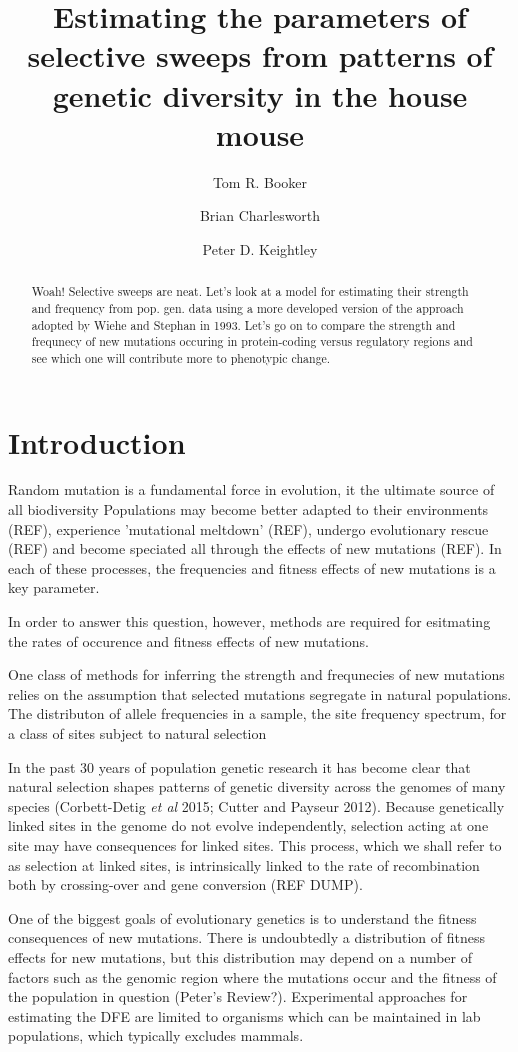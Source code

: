 \documentclass[11pt]{article}
\title{\textbf{Estimating the parameters of selective sweeps from patterns of genetic diversity in the house mouse}}
\author[1,*]{Tom R. Booker}
\author[1]{Brian Charlesworth}
\author[1]{Peter D. Keightley}
\affil[1]{Institute of Evolutionary Biology, University of Edinburgh, Edinburgh}
\affil[*]{\emph{t.r.booker@sms.ed.ac.uk}}
\begin{document}
\maketitle
\begin{abstract}
Woah! Selective sweeps are neat. Let's look at a model for estimating their strength and frequency from pop. gen. data using a more developed version of the approach adopted by Wiehe and Stephan in 1993. Let's go on to compare the strength and frequnecy of new mutations occuring in protein-coding versus regulatory regions and see which one will contribute more to phenotypic change.

\end{abstract}

\section*{Introduction}

Random mutation is a fundamental force in evolution, it the ultimate source of all biodiversity Populations may become better adapted to their environments (REF), experience 'mutational meltdown' (REF), undergo evolutionary rescue (REF) and become speciated all through the effects of new mutations (REF). In each of these processes, the frequencies and fitness effects of new mutations is a key parameter. 

In order to answer this question, however, methods are required for esitmating the rates of occurence and fitness effects of new mutations.

One class of methods for inferring the strength and frequnecies of new mutations relies on the  assumption that selected mutations segregate in natural populations. The distributon of allele frequencies in a sample, the site frequency spectrum, for a class of sites subject to natural selection 

In the past 30 years of population genetic research it has become clear that natural selection shapes patterns of genetic diversity across the genomes of many species (Corbett-Detig \textit{et al} 2015; Cutter and Payseur 2012). Because genetically linked sites in the genome do not evolve independently, selection acting at one site may have consequences for linked sites. This process, which we shall refer to as selection at linked sites, is intrinsically linked to the rate of recombination both by crossing-over and gene conversion (REF DUMP). 

One of the biggest goals of evolutionary genetics is to understand the fitness consequences of new mutations. There is undoubtedly a distribution of fitness effects for new mutations, but this distribution may depend on a number of factors such as the genomic region where the mutations occur and the fitness of the population in question (Peter's Review?). Experimental approaches for estimating the DFE are limited to organisms which can be maintained in lab populations, which typically excludes mammals. 
\end{document}
